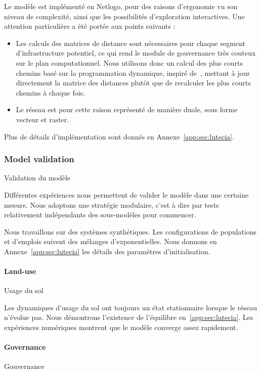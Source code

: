Le modèle est implémenté en Netlogo, pour des raisons d'ergonomie vu son niveau de complexité, ainsi que les possibilités d'exploration interactives. Une attention particulière a été portée aux points suivants :
\begin{itemize}
	\item Les calculs des matrices de distance sont nécessaires pour chaque segment d'infrastructure potentiel, ce qui rend le module de gouvernance très couteux sur le plan computationnel. Nous utilisons donc un calcul des plus courts chemins basé sur la programmation dynamique, inspiré de~\cite{tretyakov2011fast}, mettant à jour directement la matrice des distances plutôt que de recalculer les plus courts chemins à chaque fois.
	\item Le réseau est pour cette raison représenté de manière duale, sous forme vecteur et raster.
\end{itemize}


Plus de détails d'implémentation sont donnés en Annexe~\ref{app:sec:lutecia}.




\subsubsection{Model validation}{Validation du modèle}


Différentes expériences nous permettent de valider le modèle dans une certaine mesure. Nous adoptons une stratégie modulaire, c'est à dire par tests relativement indépendants des sous-modèles pour commencer.


Nous travaillons sur des systèmes synthétiques. Les configurations de populations et d'emplois suivent des mélanges d'exponentielles. Nous donnons en Annexe~\ref{app:sec:lutecia} les détails des paramètres d'initialisation.


\paragraph{Land-use}{Usage du sol}

Les dynamiques d'usage du sol ont toujours un état stationnaire lorsque le réseau n'évolue pas. Nous démontrons l'existence de l'équilibre en~\ref{app:sec:lutecia}. Les expériences numériques montrent que le modèle converge assez rapidement. 



\paragraph{Governance}{Gouvernance}


